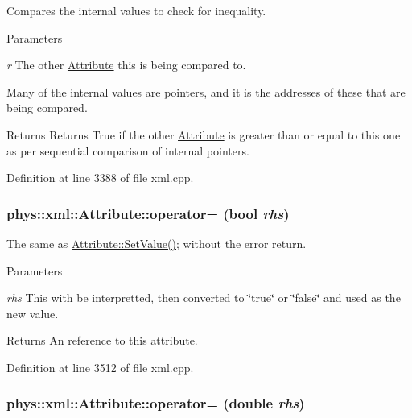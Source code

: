 Compares the internal values to check for inequality. 


\begin{DoxyParams}{Parameters}
\item[{\em r}]The other \hyperlink{classphys_1_1xml_1_1Attribute}{Attribute} this is being compared to.\end{DoxyParams}
Many of the internal values are pointers, and it is the addresses of these that are being compared. \begin{DoxyReturn}{Returns}
Returns True if the other \hyperlink{classphys_1_1xml_1_1Attribute}{Attribute} is greater than or equal to this one as per sequential comparison of internal pointers. 
\end{DoxyReturn}


Definition at line 3388 of file xml.cpp.

\hypertarget{classphys_1_1xml_1_1Attribute_a008397ad3c9c63bf27a4dca4b68e5efd}{
\subsubsection[{operator=}]{\setlength{\rightskip}{0pt plus 5cm}phys::xml::Attribute::operator= (bool {\em rhs})}}
\label{da/ddf/classphys_1_1xml_1_1Attribute_a008397ad3c9c63bf27a4dca4b68e5efd}


The same as \hyperlink{classphys_1_1xml_1_1Attribute_a470512fcd8b4f7609319bf85df100aaa}{Attribute::SetValue()}; without the error return. 


\begin{DoxyParams}{Parameters}
\item[{\em rhs}]This with be interpretted, then converted to \char`\"{}true\char`\"{} or \char`\"{}false\char`\"{} and used as the new value. \end{DoxyParams}
\begin{DoxyReturn}{Returns}
An reference to this attribute. 
\end{DoxyReturn}


Definition at line 3512 of file xml.cpp.

\hypertarget{classphys_1_1xml_1_1Attribute_ac92a92492d624984a52b64bc4fabf355}{
\subsubsection[{operator=}]{\setlength{\rightskip}{0pt plus 5cm}phys::xml::Attribute::operator= (double {\em rhs})}}
\label{da/ddf/classphys_1_1xml_1_1Attribute_ac92a92492d624984a52b64bc4fabf355}


